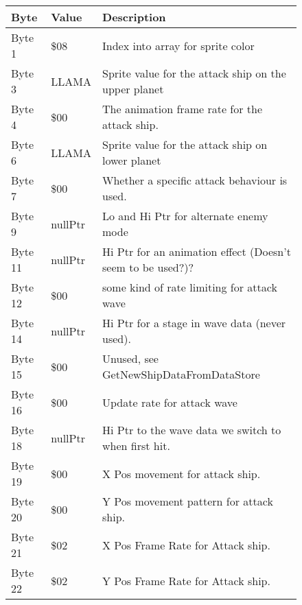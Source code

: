 \begin{figure}[H]
{\begin{adjustbox}{width=12cm}
\begin{tabular}{lll}
\toprule
 Byte    & Value                      & Description                                                        \\
\midrule
 Byte 1  & \$08                        & Index into array for sprite color                                  \\
 Byte 3  & LLAMA                      & Sprite value for the attack ship on the upper planet               \\
 Byte 4  & \$00                        & The animation frame rate for the attack ship.                      \\
 Byte 6  & LLAMA                      & Sprite value for the attack ship on lower planet                   \\
 Byte 7  & \$00                        & Whether a specific attack behaviour is used.                       \\
 Byte 9  & nullPtr                    & Lo and Hi Ptr for alternate enemy mode                             \\
 Byte 11 & nullPtr                    & Hi Ptr for an animation effect (Doesn't seem to be used?)?         \\
 Byte 12 & \$00                        & some kind of rate limiting for attack wave                         \\
 Byte 14 & nullPtr                    & Hi Ptr for a stage in wave data (never used).                      \\
 Byte 15 & \$00                        & Unused, see GetNewShipDataFromDataStore                            \\
 Byte 16 & \$00                        & Update rate for attack wave                                        \\
 Byte 18 & nullPtr                    & Hi Ptr to the wave data we switch to when first hit.               \\
 Byte 19 & \$00                        & X Pos movement for attack ship.                                    \\
 Byte 20 & \$00                        & Y Pos movement pattern for attack ship.                            \\
 Byte 21 & \$02                        & X Pos Frame Rate for Attack ship.                                  \\
 Byte 22 & \$02                        & Y Pos Frame Rate for Attack ship.                                  \\

\end{tabular}
\end{adjustbox}}
\end{figure}

